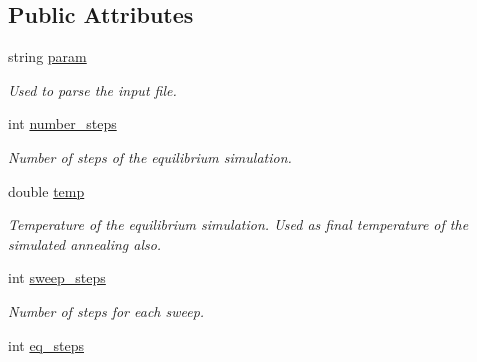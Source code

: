 \subsection*{Public Attributes}
\begin{DoxyCompactItemize}
\item 
\hypertarget{classPARSER_af6b8374a3bf76136231ab9616238b610}{
string \hyperlink{classPARSER_af6b8374a3bf76136231ab9616238b610}{param}}
\label{classPARSER_af6b8374a3bf76136231ab9616238b610}

\begin{DoxyCompactList}\small\item\em Used to parse the input file. \item\end{DoxyCompactList}\item 
\hypertarget{classPARSER_a1c15a853750b7050184b006f333d72cd}{
int \hyperlink{classPARSER_a1c15a853750b7050184b006f333d72cd}{number\_\-steps}}
\label{classPARSER_a1c15a853750b7050184b006f333d72cd}

\begin{DoxyCompactList}\small\item\em Number of steps of the equilibrium simulation. \item\end{DoxyCompactList}\item 
\hypertarget{classPARSER_a373caeb8915249e3fa0141d8926edcd1}{
double \hyperlink{classPARSER_a373caeb8915249e3fa0141d8926edcd1}{temp}}
\label{classPARSER_a373caeb8915249e3fa0141d8926edcd1}

\begin{DoxyCompactList}\small\item\em Temperature of the equilibrium simulation. Used as final temperature of the simulated annealing also. \item\end{DoxyCompactList}\item 
\hypertarget{classPARSER_a88ade7533a8bf13f641fb970c9b90cfe}{
int \hyperlink{classPARSER_a88ade7533a8bf13f641fb970c9b90cfe}{sweep\_\-steps}}
\label{classPARSER_a88ade7533a8bf13f641fb970c9b90cfe}

\begin{DoxyCompactList}\small\item\em Number of steps for each sweep. \item\end{DoxyCompactList}\item 
\hypertarget{classPARSER_ab016d48db3135a8691fc63f268e82054}{
int \hyperlink{classPARSER_ab016d48db3135a8691fc63f268e82054}{eq\_\-steps}}
\label{classPARSER_ab016d48db3135a8691fc63f268e82054}


\end{DoxyCompactItemize}

